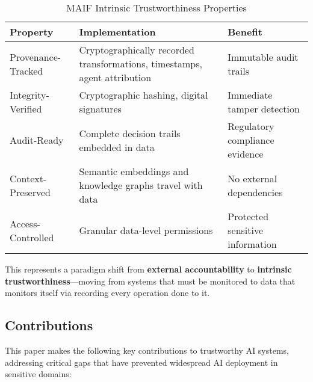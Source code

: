 \documentclass[conference]{IEEEtran}
\begin{document}
\begin{table*}[!t]
\renewcommand{\arraystretch}{1.3}
\caption{MAIF Intrinsic Trustworthiness Properties}
\label{tab:maif-trustworthiness}
\centering
\footnotesize
\begin{tabular}{p{3cm}p{6cm}p{5cm}}
\toprule
\textbf{Property} & \textbf{Implementation} & \textbf{Benefit} \\
\midrule
Provenance-Tracked & Cryptographically recorded transformations, timestamps, agent attribution & Immutable audit trails \\
Integrity-Verified & Cryptographic hashing, digital signatures & Immediate tamper detection \\
Audit-Ready & Complete decision trails embedded in data & Regulatory compliance evidence \\
Context-Preserved & Semantic embeddings and knowledge graphs travel with data & No external dependencies \\
Access-Controlled & Granular data-level permissions & Protected sensitive information \\
\bottomrule
\end{tabular}
\end{table*}

This represents a paradigm shift from \textbf{external accountability} to \textbf{intrinsic trustworthiness}—moving from systems that must be monitored to data that monitors itself via recording every operation done to it.

\subsection{Contributions}

This paper makes the following key contributions to trustworthy AI systems, addressing critical gaps that have prevented widespread AI deployment in sensitive domains:
\end{document}
